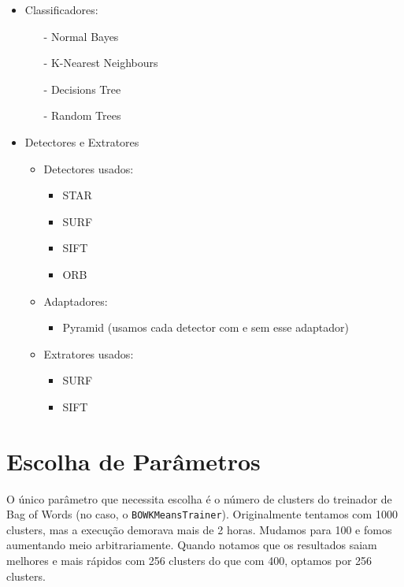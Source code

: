 \documentclass[a4paper,11pt]{article}
\begin{document}
  \begin{itemize}
    \item Classificadores:
    \begin{itemize}
      \item[-] Normal Bayes
      \item[-] K-Nearest Neighbours
      \item[-] Decisions Tree
      \item[-] Random Trees
    \end{itemize}
    
    \item Detectores e Extratores
      \begin{itemize}
        \item Detectores usados:
          \begin{itemize}
            \item STAR
            \item SURF
            \item SIFT
            \item ORB\footnotemark
          \end{itemize}
  
        \item Adaptadores:
          \begin{itemize} 
            \item Pyramid (usamos cada detector com e sem esse adaptador)
          \end{itemize}
  
        \item Extratores usados:
          \begin{itemize} 
            \item SURF
            \item SIFT
          \end{itemize}
  
      \end{itemize}
  
  \end{itemize}
  

\section{Escolha de Parâmetros}

  O único parâmetro que necessita escolha é o número de clusters do treinador de
  Bag of Words (no caso, o \verb$BOWKMeansTrainer$). Originalmente tentamos com
  1000 clusters, mas a execução demorava mais de 2 horas. Mudamos para 100 e
  fomos aumentando meio arbitrariamente. Quando notamos que os resultados saiam
  melhores e mais rápidos com 256 clusters do que com 400, optamos por 256
  clusters.
\end{document}
